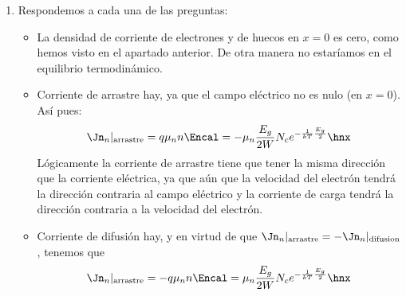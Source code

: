 \begin{enumerate}[label=\alph*)]
		\item Respondemos a cada una de las preguntas:
		\begin{itemize}
			\item La densidad de corriente de electrones y de huecos en $x=0$ es cero, como hemos visto en el apartado anterior. De otra manera no estaríamos en el equilibrio termodinámico.
			\item Corriente de arrastre hay, ya que el campo eléctrico no es nulo (en $x=0$). Así pues:
			\begin{equation}
				\Jn_n |_{\text{arrastre}} = q \mu_n n \Encal =  - \mu_n \frac{E_g}{2W} N_c  e^{-\frac{1}{kT}\frac{E_g}{2}}  \hnx
			\end{equation}
			Lógicamente la corriente de arrastre tiene que tener la misma dirección que la corriente eléctrica, ya que aún que la velocidad del electrón tendrá la dirección contraria al campo eléctrico y la corriente de carga tendrá la dirección contraria a la velocidad del electrón.
			\item Corriente de difusión hay, y en virtud de que $\Jn_n|_{\text{arrastre}}=- \Jn_n|_{\text{difusion}}$, tenemos que
			\begin{equation}
				\Jn_n |_{\text{arrastre}} = - q \mu_n n \Encal =  \mu_n \frac{E_g}{2W} N_c  e^{-\frac{1}{kT}\frac{E_g}{2}}  \hnx
			\end{equation}
		\end{itemize}
	\end{enumerate}
